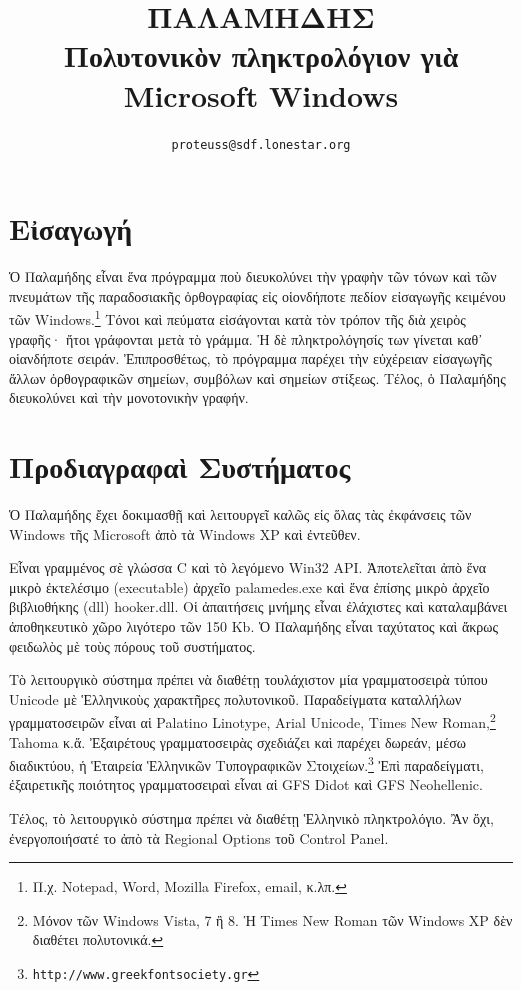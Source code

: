 \documentclass[12pt,a4paper]{article}
\title{ΠΑΛΑΜΗΔΗΣ\\{\small 
Πολυτονικὸν πληκτρολόγιον γιὰ Microsoft Windows
}}
\author{\tt {\small proteuss@sdf.lonestar.org}}
\date{}
\begin{document}
\maketitle
\section*{Εἰσαγωγή}

  Ὁ Παλαμήδης εἶναι ἕνα πρόγραμμα ποὺ διευκολύνει τὴν γραφὴν τῶν τόνων καὶ
  τῶν πνευμάτων τῆς παραδοσιακῆς ὀρθογραφίας εἰς οἱονδήποτε πεδίον εἰσαγωγῆς
  κειμένου τῶν Windows.\footnote{Π.χ. Notepad, Word, Mozilla Firefox, email, κ.λπ.}
  Τόνοι καὶ πεύματα εἰσάγονται
  κατὰ τὸν τρόπον τῆς διὰ χειρὸς γραφῆς· ἤτοι γράφονται μετὰ τὸ γράμμα. Ἡ δὲ
  πληκτρολόγησίς των γίνεται καθ᾽ οἱανδήποτε σειράν.  Ἐπιπροσθέτως, τὸ
  πρόγραμμα παρέχει τὴν εὐχέρειαν εἰσαγωγῆς ἄλλων ὀρθογραφικῶν
  σημείων, συμβόλων καὶ σημείων στίξεως. Τέλος, ὁ Παλαμήδης διευκολύνει
  καὶ τὴν μονοτονικὴν γραφήν.


\section*{Προδιαγραφαὶ Συστήματος}
%
  Ὁ Παλαμήδης ἔχει δοκιμασθῇ καὶ λειτουργεῖ καλῶς εἰς ὅλας τὰς ἐκφάνσεις
  τῶν Windows τῆς Microsoft ἀπὸ τὰ Windows XP καὶ ἐντεῦθεν.

  Εἶναι γραμμένος σὲ γλώσσα C καὶ τὸ λεγόμενο Win32 API.  Ἀποτελεῖται ἀπὸ
  ἕνα μικρὸ ἐκτελέσιμο (executable) ἀρχεῖο \textsf{palamedes.exe} καὶ ἕνα ἐπίσης
  μικρὸ ἀρχεῖο βιβλιοθήκης (dll) \textsf{hooker.dll}.  Οἱ ἀπαιτήσεις μνήμης εἶναι
  ἐλάχιστες καὶ καταλαμβάνει ἀποθηκευτικὸ χῶρο λιγότερο τῶν 150 Kb. 
  Ὁ Παλαμήδης εἶναι ταχύτατος καὶ ἄκρως φειδωλὸς μὲ τοὺς πόρους τοῦ συστήματος.

  Τὸ λειτουργικὸ σύστημα πρέπει νὰ διαθέτῃ τουλάχιστον μία γραμματοσειρὰ
  τύπου Unicode μὲ Ἑλληνικοὺς χαρακτῆρες πολυτονικοῦ.  Παραδείγματα
  καταλλήλων γραμματοσειρῶν εἶναι αἱ Palatino Linotype, Arial Unicode,
  Times New Roman,\footnote{Μόνον τῶν Windows Vista, 7 ἢ 8. Ἡ Times New Roman
  τῶν Windows XP δὲν διαθέτει πολυτονικά.} Tahoma κ.ἄ.  Ἐξαιρέτους
  γραμματοσειρὰς σχεδιάζει καὶ παρέχει δωρεάν, μέσω διαδικτύου, ἡ Ἑταιρεία
  Ἑλληνικῶν Τυπογραφικῶν
  Στοιχείων.\footnote{\texttt{http://www.greekfontsociety.gr}} Ἐπὶ παραδείγματι,
  ἐξαιρετικῆς ποιότητος γραμματοσειραὶ εἶναι αἱ GFS Didot καὶ GFS
  Neohellenic.

  Τέλος, τὸ λειτουργικὸ σύστημα πρέπει νὰ διαθέτῃ Ἑλληνικὸ πληκτρολόγιο.
  Ἂν ὄχι, ἐνεργοποιήσατέ το ἀπὸ τὰ Regional Options τοῦ Control Panel.
\end{document}

